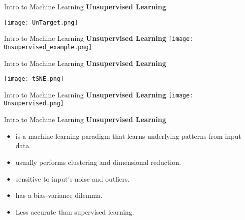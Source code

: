 \documentclass{beamer}
\begin{document}
\begin{frame}[fragile]{Intro to Machine Learning}
    \textbf{Unsupervised Learning}
    \begin{center}
        \texttt{[image: UnTarget.png]}
    \end{center}
\end{frame}
\begin{frame}[fragile]{Intro to Machine Learning}
    \textbf{Unsupervised Learning}
    \texttt{[image: Unsupervised\_example.png]}
\end{frame}
\begin{frame}[fragile]{Intro to Machine Learning}
    \textbf{Unsupervised Learning}
    \begin{center}
        \texttt{[image: tSNE.png]}
    \end{center}
\end{frame}
\begin{frame}[fragile]{Intro to Machine Learning}
    \textbf{Unsupervised Learning}
    \texttt{[image: Unsupervised.png]}
\end{frame}
\begin{frame}[fragile]{Intro to Machine Learning}
    \textbf{Unsupervised Learning}
    \begin{itemize}
        \item is a machine learning paradigm that learns underlying patterns from input data.
        \item usually performs clustering and dimensional reduction.
        \pause
        \item sensitive to input's noise and outliers.
        \item has a bias-variance dilemma.
        \item Less accurate than supervised learning.
    \end{itemize}
\end{frame}
\end{document}
